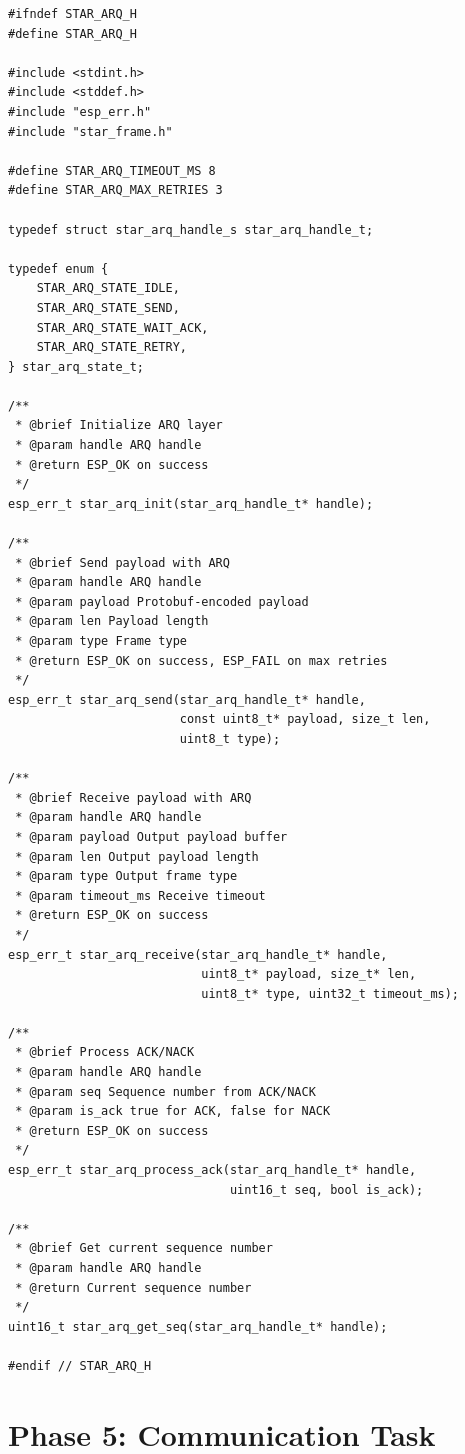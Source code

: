 \begin{lstlisting}[caption={star\_arq.h - ARQ Layer Interface}]
#ifndef STAR_ARQ_H
#define STAR_ARQ_H

#include <stdint.h>
#include <stddef.h>
#include "esp_err.h"
#include "star_frame.h"

#define STAR_ARQ_TIMEOUT_MS 8
#define STAR_ARQ_MAX_RETRIES 3

typedef struct star_arq_handle_s star_arq_handle_t;

typedef enum {
    STAR_ARQ_STATE_IDLE,
    STAR_ARQ_STATE_SEND,
    STAR_ARQ_STATE_WAIT_ACK,
    STAR_ARQ_STATE_RETRY,
} star_arq_state_t;

/**
 * @brief Initialize ARQ layer
 * @param handle ARQ handle
 * @return ESP_OK on success
 */
esp_err_t star_arq_init(star_arq_handle_t* handle);

/**
 * @brief Send payload with ARQ
 * @param handle ARQ handle
 * @param payload Protobuf-encoded payload
 * @param len Payload length
 * @param type Frame type
 * @return ESP_OK on success, ESP_FAIL on max retries
 */
esp_err_t star_arq_send(star_arq_handle_t* handle,
                        const uint8_t* payload, size_t len,
                        uint8_t type);

/**
 * @brief Receive payload with ARQ
 * @param handle ARQ handle
 * @param payload Output payload buffer
 * @param len Output payload length
 * @param type Output frame type
 * @param timeout_ms Receive timeout
 * @return ESP_OK on success
 */
esp_err_t star_arq_receive(star_arq_handle_t* handle,
                           uint8_t* payload, size_t* len,
                           uint8_t* type, uint32_t timeout_ms);

/**
 * @brief Process ACK/NACK
 * @param handle ARQ handle
 * @param seq Sequence number from ACK/NACK
 * @param is_ack true for ACK, false for NACK
 * @return ESP_OK on success
 */
esp_err_t star_arq_process_ack(star_arq_handle_t* handle,
                               uint16_t seq, bool is_ack);

/**
 * @brief Get current sequence number
 * @param handle ARQ handle
 * @return Current sequence number
 */
uint16_t star_arq_get_seq(star_arq_handle_t* handle);

#endif // STAR_ARQ_H
\end{lstlisting}

\section{Phase 5: Communication Task}

